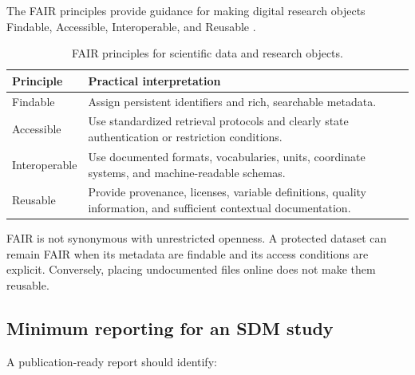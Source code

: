 The FAIR principles provide guidance for making digital research objects Findable, Accessible, Interoperable, and Reusable \parencite{wilkinson2016fair}.

\begin{table}[H]
\centering
\caption{FAIR principles for scientific data and research objects.}
\label{tab:fair_principles}
\begin{tabular}{p{}p{}}
\toprule
\textbf{Principle} & \textbf{Practical interpretation} \\
\midrule
Findable & Assign persistent identifiers and rich, searchable metadata. \\
Accessible & Use standardized retrieval protocols and clearly state authentication or restriction conditions. \\
Interoperable & Use documented formats, vocabularies, units, coordinate systems, and machine-readable schemas. \\
Reusable & Provide provenance, licenses, variable definitions, quality information, and sufficient contextual documentation. \\
\bottomrule
\end{tabular}
\end{table}

FAIR is not synonymous with unrestricted openness. A protected dataset can remain FAIR when its metadata are findable and its access conditions are explicit. Conversely, placing undocumented files online does not make them reusable.

\subsection{Minimum reporting for an SDM study}

A publication-ready report should identify:

